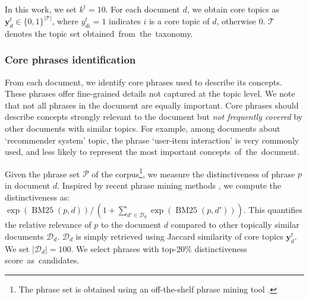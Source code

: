 In this work, we set $k^t=10$.
For each document $d$, we obtain core topics as $\mathbf{y}^t_d \in \{0,1\}^{|\mathcal{T}|}$, where $y^t_{di}=1$ indicates $i$ is a core topic of $d$, otherwise $0$.
$\mathcal{T}$ denotes the topic set obtained~from~the~taxonomy.


% 







% 

\subsubsection{\textbf{Core phrases identification}}
\label{method:core_phrase}
From each document, we identify core phrases used to describe its concepts.
These phrases offer fine-grained details not captured at the topic level.
We note that not all phrases in the document are equally important.
Core phrases should describe concepts strongly relevant to the document but \textit{not frequently covered} by other documents with similar topics.
For example, among documents about `recommender system' topic, the phrase `user-item interaction' is very commonly used, and less likely to represent the most important concepts~of~the~document.  


Given the phrase set $\mathcal{P}$ of the corpus\footnote{The phrase set is obtained using an off-the-shelf phrase mining tool \cite{autophrase}.}, we measure the distinctiveness of phrase $p$ in document $d$.
Inspired by recent phrase mining methods \cite{tao2016multi, lee2022taxocom}, we compute the distinctiveness as: $\exp(\operatorname{BM25}(p, d))/\,(1 + \sum_{d'\in\mathcal{D}_{d}}\exp(\operatorname{BM25}(p, d')))$.
This quantifies the relative relevance of $p$ to the document $d$ compared to other topically similar documents $\mathcal{D}_{d}$. 
$\mathcal{D}_{d}$ is simply retrieved using Jaccard similarity of core topics $\mathbf{y}^t_d$.
We set $|\mathcal{D}_{d}|=100$.
We select phrases with top-20\% distinctiveness score~as~candidates. 

